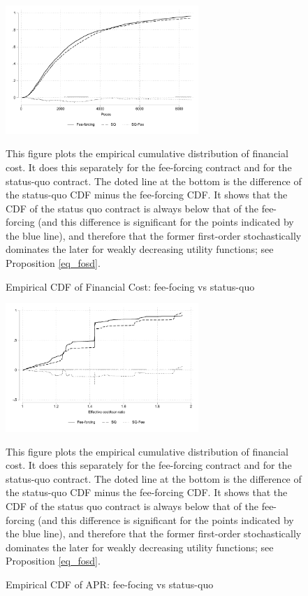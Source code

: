 \vspace{.2in}
\begin{figure}[H]
        \caption{Empirical CDF of Financial Cost: fee-focing vs status-quo}
    \label{ecdf_fc}
    \begin{center}
        \centering
        \includegraphics[width=0.65\textwidth]{Figuras/cdf_fc_pro_2.pdf}
    \end{center}
    \scriptsize This figure plots the empirical cumulative distribution of financial cost. It does this separately for the fee-forcing contract and for the status-quo contract. The doted line at the bottom is the difference of the status-quo CDF minus the fee-forcing CDF. It shows that the CDF of the status quo contract is always below that of the fee-forcing (and this difference is significant for the points indicated by the blue line), and therefore that the former first-order stochastically dominates the later for weakly decreasing utility functions; see Proposition \ref{eq_fosd}.
\end{figure}

\begin{figure}[H]
        \caption{Empirical CDF of APR: fee-focing vs status-quo}
    \label{ecdf_fc}
    \begin{center}
        \centering
        \includegraphics[width=0.65\textwidth]{Figuras/cdf_eff_pro_2.pdf}
    \end{center}
    \scriptsize This figure plots the empirical cumulative distribution of financial cost. It does this separately for the fee-forcing contract and for the status-quo contract. The doted line at the bottom is the difference of the status-quo CDF minus the fee-forcing CDF. It shows that the CDF of the status quo contract is always below that of the fee-forcing (and this difference is significant for the points indicated by the blue line), and therefore that the former first-order stochastically dominates the later for weakly decreasing utility functions; see Proposition \ref{eq_fosd}.
\end{figure}


